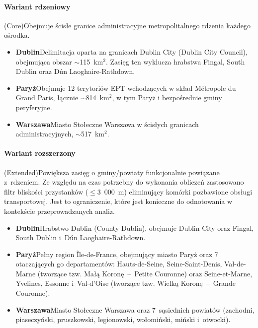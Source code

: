 \documentclass{pracamgr}
\begin{document}
\paragraph{Wariant rdzeniowy} (Core)\newline Obejmuje ścisłe granice administracyjne metropolitalnego rdzenia każdego ośrodka.
\begin{itemize}
\item[]\textbf{Dublin}\newline Delimitacja oparta na granicach Dublin City (Dublin City Council), obejmująca obszar $\sim$115~km$^2$. Zasięg ten wyklucza hrabstwa Fingal, South Dublin oraz Dún Laoghaire-Rathdown.
\item[]\textbf{Paryż}\newline Obejmuje 12 terytoriów EPT wchodzących w skład Métropole du Grand Paris, łącznie $\sim$814~km$^2$, w tym Paryż i bezpośrednie gminy peryferyjne.
\item[]\textbf{Warszawa}\newline Miasto Stołeczne Warszawa w ścisłych granicach administracyjnych, $\sim$517~km$^2$.
\end{itemize}

\paragraph{Wariant rozszerzony} (Extended)\newline Powiększa zasięg o gminy/powiaty funkcjonalnie powiązane z~rdzeniem. Ze względu na czas potrzebny do wykonania obliczeń zastosowano filtr bliskości przystanków ($\leq$3~000~m) eliminujący komórki pozbawione obsługi transportowej. Jest to ograniczenie, które jest konieczne do odnotowania w kontekście przeprowadzanych analiz.
\begin{itemize}
\item[]\textbf{Dublin}\newline Hrabstwo Dublin (County Dublin), obejmuje Dublin City oraz Fingal, South Dublin i~Dún Laoghaire-Rathdown.
\item[]\textbf{Paryż}\newline Pełny region \mbox{Île-de-France}, obejmujący miasto Paryż oraz 7 otaczających go departamentów: \mbox{Hauts-de-Seine}, \mbox{Seine-Saint-Denis}, \mbox{Val-de-Marne} (tworzące tzw. Małą Koronę~–~Petite Couronne) oraz \mbox{Seine-et-Marne}, Yvelines, Essonne i~\mbox{Val-d'Oise} (tworzące tzw. Wielką Koronę~–~Grande Couronne).
\item[]\textbf{Warszawa}\newline Miasto Stołeczne Warszawa oraz 7~sąsiednich powiatów (zachodni, piaseczyński, pruszkowski, legionowski, wołomiński, miński i~otwocki).
\end{itemize}
\end{document}
